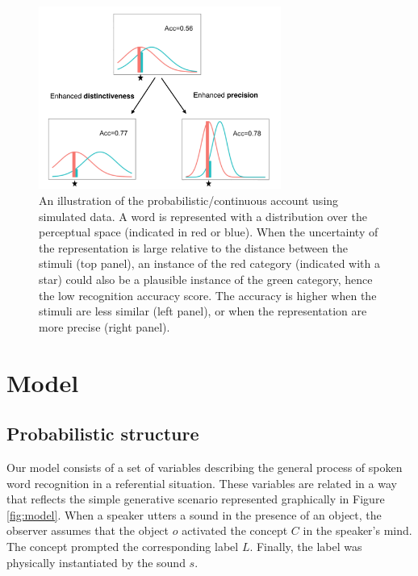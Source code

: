 \documentclass[english,,man]{apa6}
\begin{document}
\begin{figure}

{\centering \includegraphics[width=300px]{figs/illustration} 

}

\caption{An illustration of the probabilistic/continuous account using simulated data. A word is represented with a distribution over the perceptual space (indicated in red or blue). When the uncertainty of the representation is large relative to the distance between the stimuli (top panel), an instance of the red category (indicated with a star) could also be a plausible instance of the green category, hence the low recognition accuracy score. The accuracy is higher when the stimuli are less similar (left panel), or when the representation are more precise (right panel).}\label{fig:illus}
\end{figure}

\hypertarget{model}{%
\section{Model}\label{model}}

\hypertarget{probabilistic-structure}{%
\subsection{Probabilistic structure}\label{probabilistic-structure}}

Our model consists of a set of variables describing the general process of spoken word recognition in a referential situation. These variables are related in a way that reflects the simple generative scenario represented graphically in Figure \ref{fig:model}. When a speaker utters a sound in the presence of an object, the observer assumes that the object \(o\) activated the concept \(C\) in the speaker's mind. The concept prompted the corresponding label \(L\). Finally, the label was physically instantiated by the sound \(s\).
\end{document}
